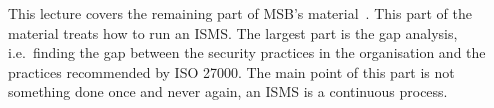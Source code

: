 This lecture covers the remaining part of MSB's material~\cite{%
	MSB2011gap,MSB2011vs,MSB2011us,MSB2011upo,%
	MSB2011pg,MSB2011koa,MSB2011i,MSB2011o,MSB2011g,%
	MSB2011lg,MSB2011ulo,MSB2011kf,MSB2011fa%
}.
This part of the material treats how to run an ISMS\@.
The largest part is the gap analysis, i.e.~finding the gap between the security 
practices in the organisation and the practices recommended by ISO 27000.
The main point of this part is not something done once and never again, an ISMS 
is a continuous process.
